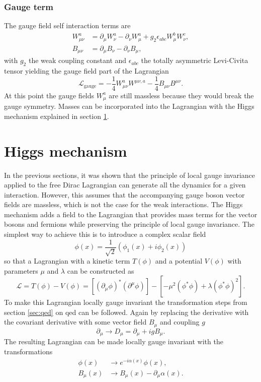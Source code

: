 \subsubsection*{Gauge term}
The gauge field self interaction terms are
\begin{align}
    W_{\mu\nu}^a & =\partial_\mu W_\nu^a-\partial_\nu W_\mu^a+g_2\epsilon_{abc}W_\mu^b W_\nu^c, \\
    B_{\mu\nu}   & =\partial_\mu B_\nu-\partial_\nu B_\mu,
\end{align}
with $g_2$ the weak coupling constant and $\epsilon_{abc}$ the totally asymmetric Levi-Civita tensor yielding the gauge field part of the Lagrangian
\begin{equation}
    \mathcal {L}_\text{gauge} = -\frac{1}{4} W_{\mu\nu}^a W^{\mu\nu,a} - \frac{1}{4}B_{\mu\nu}B^{\mu\nu}.
\end{equation}
At this point the gauge fields $W^a_\mu$ are still massless because they would break the gauge symmetry. Masses can be incorporated into the Lagrangian with the Higgs mechanism explained in section \ref{sec:higgs_mechanism}.

\section{Higgs mechanism}\label{sec:higgs_mechanism}

In the previous sections, it was shown that the principle of local gauge invariance applied to the free Dirac Lagrangian can generate all the dynamics for a given interaction. However, this assumes that the accompanying gauge boson vector fields are massless, which is not the case for the weak interactions. The Higgs mechanism adds a field to the Lagrangian that provides mass terms for the vector bosons and fermions while preserving the principle of local gauge invariance. The simplest way to achieve this is to introduce a complex scalar field
\begin{equation}
    \phi (x)=\frac{1}{\sqrt{2}}(\phi_1(x)+i\phi_2(x))
\end{equation}
so that a Lagrangian with a kinetic term $T(\phi)$ and a potential $V(\phi)$ with parameters $\mu$ and $\lambda$ can be constructed as
\begin{equation}
    \mathcal{L}=T(\phi)-V(\phi)=
    \left[\left(\partial_\mu\phi\right)^* (\partial^\mu\phi)\right]
    -\left[
        -\mu^2(\phi^*\phi)+\lambda(\phi^*\phi)^2
        \right].
\end{equation}
To make this Lagrangian locally gauge invariant the transformation steps from section \ref{sec:qed} on \ac{qed} can be followed. Again by replacing the derivative with the covariant derivative with some vector field $B_\mu$ and coupling $g$
\begin{equation}
    \partial_\mu \rightarrow D_\mu = \partial_\mu + ig B_\mu.
\end{equation}
The resulting Lagrangian can be made locally gauge invariant with the transformations
\begin{align}
    \phi(x)  & \rightarrow  e^{-i \alpha(x)}\phi(x),                      \\
    B_\mu(x) & \xrightarrow{} B_\mu(x) -\partial_\mu\alpha(x).
\end{align}

